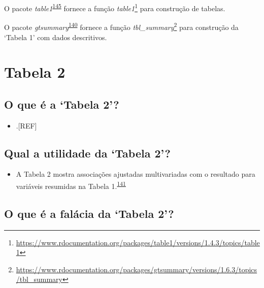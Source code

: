 \documentclass[
  a4paper,
]{book}
\providecommand{\tightlist}{%
  \setlength{\itemsep}{0pt}\setlength{\parskip}{0pt}}
\renewcommand{\href}[2]{#2\footnote{\url{#1}}}
\newenvironment{infobox}[1]
  {
  \begin{itemize}
  \renewcommand{\labelitemi}{
    \raisebox{-.7\height}[0pt][0pt]{
      {\setkeys{Gin}{width=3em,keepaspectratio}
        \texttt{[image: \#1]}}
    }
  }
  \setlength{\fboxsep}{1em}
  \begin{blackbox}
  \item
  }
  {
  \end{blackbox}
  \end{itemize}
  }
\begin{document}
\begin{infobox}{images/Rlogo}
O pacote \emph{table1}\textsuperscript{\protect\hyperlink{ref-table1}{145}} fornece a função \href{https://www.rdocumentation.org/packages/table1/versions/1.4.3/topics/table1}{\emph{table1}} para construção de tabelas.

\end{infobox}

\begin{infobox}{images/Rlogo}
O pacote \emph{gtsummary}\textsuperscript{\protect\hyperlink{ref-gtsummary-2}{140}} fornece a função \href{https://www.rdocumentation.org/packages/gtsummary/versions/1.6.3/topics/tbl_summary}{\emph{tbl\_summary}} para construção da `Tabela 1' com dados descritivos.

\end{infobox}

\hypertarget{tabela-2}{%
\section{Tabela 2}\label{tabela-2}}

\hypertarget{o-que-uxe9-a-tabela-2}{%
\subsection{O que é a `Tabela 2'?}\label{o-que-uxe9-a-tabela-2}}

\begin{itemize}
\tightlist
\item
  .{[}REF{]}
\end{itemize}

\hypertarget{qual-a-utilidade-da-tabela-2}{%
\subsection{Qual a utilidade da `Tabela 2'?}\label{qual-a-utilidade-da-tabela-2}}

\begin{itemize}
\tightlist
\item
  A Tabela 2 mostra associações ajustadas multivariadas com o resultado para variáveis resumidas na Tabela 1.\textsuperscript{\protect\hyperlink{ref-Westreich2013}{141}}
\end{itemize}

\hypertarget{o-que-uxe9-a-faluxe1cia-da-tabela-2}{%
\subsection{O que é a falácia da `Tabela 2'?}\label{o-que-uxe9-a-faluxe1cia-da-tabela-2}}
\end{document}
